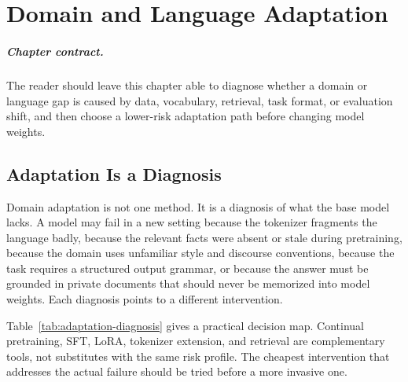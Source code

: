 \chapter{Domain and Language Adaptation}
\label{ch:domain-language-adaptation}


\paragraph{Chapter contract.} The reader should leave this chapter able to diagnose whether a domain or language gap is caused by data, vocabulary, retrieval, task format, or evaluation shift, and then choose a lower-risk adaptation path before changing model weights.

\section{Adaptation Is a Diagnosis}
\label{sec:domain-adaptation-diagnosis}

Domain adaptation is not one method. It is a diagnosis of what the base model lacks. A model may fail in a new setting because the tokenizer fragments the language badly, because the relevant facts were absent or stale during pretraining, because the domain uses unfamiliar style and discourse conventions, because the task requires a structured output grammar, or because the answer must be grounded in private documents that should never be memorized into model weights. Each diagnosis points to a different intervention.

Table~\ref{tab:adaptation-diagnosis} gives a practical decision map. Continual pretraining, SFT, LoRA, tokenizer extension, and retrieval are complementary tools, not substitutes with the same risk profile. The cheapest intervention that addresses the actual failure should be tried before a more invasive one.


